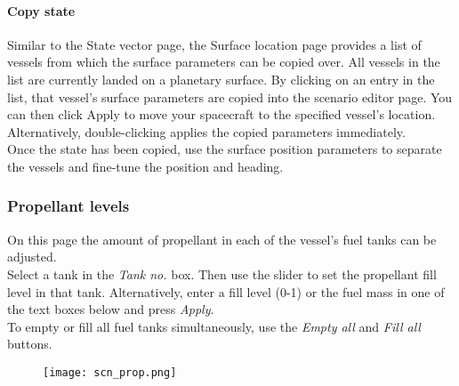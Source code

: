 \documentclass[Orbiter User Manual.tex]{subfiles}
\begin{document}
\paragraph{Copy state}
Similar to the State vector page, the Surface location page provides a list of vessels from which the surface parameters can be copied over. All vessels in the list are currently landed on a planetary surface. By clicking on an entry in the list, that vessel's surface parameters are copied into the scenario editor page. You can then click Apply to move your spacecraft to the specified vessel's location. Alternatively, double-clicking applies the copied parameters immediately.\\
Once the state has been copied, use the surface position parameters to separate the vessels and fine-tune the position and heading.

\subsubsection{Propellant levels}
On this page the amount of propellant in each of the vessel's fuel tanks can be adjusted.\\
Select a tank in the \textit{Tank no.} box. Then use the slider to set the propellant fill level in that tank. Alternatively, enter a fill level (0-1) or the fuel mass in one of the text boxes below and press \textit{Apply}.\\
To empty or fill all fuel tanks simultaneously, use the \textit{Empty all} and \textit{Fill all} buttons.

\begin{figure}[H]
	\centering
	\texttt{[image: scn\_prop.png]}
\end{figure}
\end{document}

